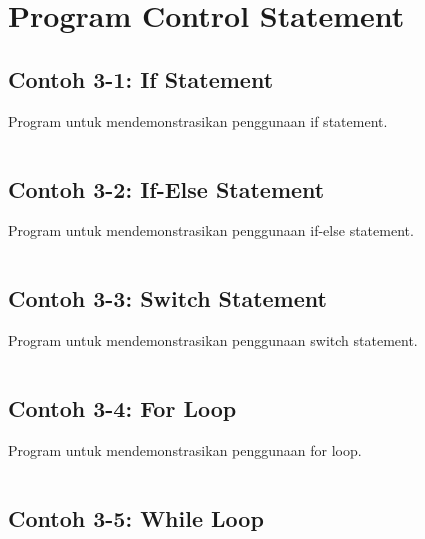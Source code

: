 \section{Program Control Statement}

\subsection{Contoh 3-1: If Statement}

Program untuk mendemonstrasikan penggunaan if statement.

\begin{lstlisting}[language=c++, caption=If Statement]

\end{lstlisting}

\subsection{Contoh 3-2: If-Else Statement}

Program untuk mendemonstrasikan penggunaan if-else statement.

\begin{lstlisting}[language=c++, caption=If-Else Statement]

\end{lstlisting}

\subsection{Contoh 3-3: Switch Statement}

Program untuk mendemonstrasikan penggunaan switch statement.

\begin{lstlisting}[language=c++, caption=Switch Statement]

\end{lstlisting}

\subsection{Contoh 3-4: For Loop}

Program untuk mendemonstrasikan penggunaan for loop.

\begin{lstlisting}[language=c++, caption=For Loop]

\end{lstlisting}

\subsection{Contoh 3-5: While Loop}

